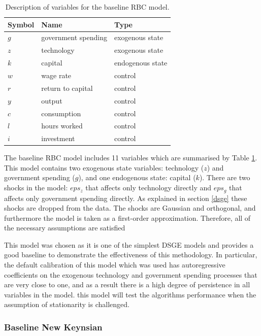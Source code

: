 \documentclass{article}
\begin{document}
\begin{table}
  \centering
  \begin{tabular}{|l|l|l|}
    \hline
    Symbol & Name & Type \\
    \hline
    $g$ & government spending & exogenous state \\
    $z$ & technology & exogenous state \\
    $k$ & capital & endogenous state \\
    $w$ & wage rate & control \\
    $r$ & return to capital & control \\
    $y$ & output & control \\
    $c$ & consumption & control \\
    $l$ & hours worked & control \\
    $i$ & investment & control \\ \cline{2-2}
    \hline
  \end{tabular}
  \caption{Description of variables for the baseline RBC model.}
  \label{rbc_data}
\end{table}

The baseline RBC model includes 11 variables which are summarised by Table \ref{rbc_data}. This model contains two exogenous state variables: technology ($z$) and government spending ($g$), and one endogenous state: capital ($k$). There are two shocks in the model: $eps_z$ that affects only technology directly and $eps_g$ that affects only government spending directly. As explained in section \ref{dsge} these shocks are dropped from the data. The shocks are Gaussian and orthogonal, and furthermore the model is taken as a first-order approximation. Therefore, all of the necessary assumptions are satisfied

This model was chosen as it is one of the simplest DSGE models and provides a good baseline to demonstrate the effectiveness of this methodology. In particular, the default calibration of this model which was used has autoregressive coefficients on the exogenous technology and government spending processes that are very close to one, and as a result there is a high degree of persistence in all variables in the model. this model will test the algorithms performance when the assumption of stationarity is challenged.

\subsubsection{Baseline New Keynsian}
\end{document}
